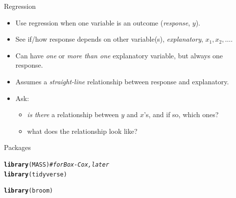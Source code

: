 \documentclass[unknownkeysallowed]{beamer}\usepackage[]{graphicx}\usepackage[]{color}
\makeatletter
\newcommand{\hlcom}[1]{\textcolor[rgb]{0.678,0.584,0.686}{\textit{#1}}}%
\newcommand{\hlstd}[1]{\textcolor[rgb]{0.345,0.345,0.345}{#1}}%
\newcommand{\hlkwd}[1]{\textcolor[rgb]{0.737,0.353,0.396}{\textbf{#1}}}%
\newenvironment{kframe}{%
 \def\at@end@of@kframe{}%
 \ifinner\ifhmode%
  \def\at@end@of@kframe{\end{minipage}}%
  \begin{minipage}{\columnwidth}%
 \fi\fi%
 \def\FrameCommand##1{\hskip\@totalleftmargin \hskip-\fboxsep
 \colorbox{shadecolor}{##1}\hskip-\fboxsep
     \hskip-\linewidth \hskip-\@totalleftmargin \hskip\columnwidth}%
 \MakeFramed {\advance\hsize-\width
   \@totalleftmargin\z@ \linewidth\hsize
   \@setminipage}}%
 {\par\unskip\endMakeFramed%
 \at@end@of@kframe}
\newenvironment{knitrout}{}{} %
\makeatother
\begin{document}
\begin{frame}{Regression}

  \begin{itemize}
  \item Use regression when one variable is an outcome ({\em response}, $y$).
  \item See if/how response depends on other variable(s), {\em explanatory}, $x_1, x_2,\ldots$.
  \item Can have {\em one} or {\em more than one} explanatory variable, but always one response.
  \item Assumes a {\em straight-line} relationship between response and explanatory.
  \item Ask: 
    \begin{itemize}
    \item {\em is there} a relationship between $y$ and $x$'s, and if so, which ones?
    \item what does the relationship look like?
    \end{itemize}

  \end{itemize}
  
\end{frame}

\begin{frame}[fragile]{Packages}
  
\begin{knitrout}
\color{fgcolor}\begin{kframe}
\begin{alltt}
\hlkwd{library}\hlstd{(MASS)} \hlcom{# for Box-Cox, later}
\hlkwd{library}\hlstd{(tidyverse)}
\end{alltt}


{\ttfamily\noindent\itshape\color{messagecolor}{\#\# -- Attaching packages ---------------------------------- tidyverse 1.2.1 --}}

{\ttfamily\noindent\itshape\color{messagecolor}{\#\# v ggplot2 3.1.0\ \ \ \ \ \  v purrr\ \  0.3.1\ \ \\\#\# v tibble\ \ 2.0.1\ \ \ \ \ \  v dplyr\ \  0.8.0.1\\\#\# v tidyr\ \  0.8.3\ \ \ \ \ \  v stringr 1.4.0\ \ \\\#\# v readr\ \  1.3.1\ \ \ \ \ \  v forcats 0.3.0}}

{\ttfamily\noindent\itshape\color{messagecolor}{\#\# -- Conflicts ------------------------------------- tidyverse\_conflicts() --\\\#\# x dplyr::filter() masks stats::filter()\\\#\# x dplyr::lag()\ \ \ \ masks stats::lag()\\\#\# x dplyr::select() masks MASS::select()}}\begin{alltt}
\hlkwd{library}\hlstd{(broom)}
\end{alltt}
\end{kframe}
\end{knitrout}
  
\end{frame}
\end{document}
